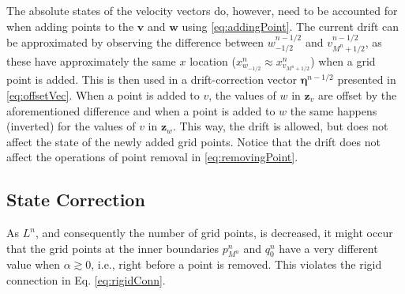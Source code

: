 The absolute states of the velocity vectors do, however, need to be accounted for when adding points to the $\mathbf{v}$ and $\mathbf{w}$ using \eqref{eq:addingPoint}. The current drift can be approximated by observing the difference between $w_{-1/2}^{n-1/2}$ and $v_{M^n+1/2}^{n-1/2}$, as these have approximately the same $x$ location ($x_{w_{-1/2}}^n \approx x_{v_{M^n+1/2}}^n$) when a grid point is added. This is then used in a drift-correction vector $\boldsymbol{\eta}^{n-1/2}$ presented in \eqref{eq:offsetVec}. When a point is added to $v$, the values of $w$ in $\mathbf{z}_{v}$ are offset by the aforementioned difference and when a point is added to $w$ the same happens (inverted) for the values of $v$ in $\mathbf{z}_w$. This way, the drift is allowed, but does not affect the state of the newly added grid points. Notice that the drift does not affect the operations of point removal in \eqref{eq:removingPoint}.

\subsection{State Correction}
As $L^n$, and consequently the number of grid points, is decreased, it might occur that the grid points at the inner boundaries $p_{M^n}^n$ and $q_0^n$ have a very different value when $\alpha \gtrsim 0$, i.e., right before a point is removed. This violates the rigid connection in Eq. \eqref{eq:rigidConn}. 

